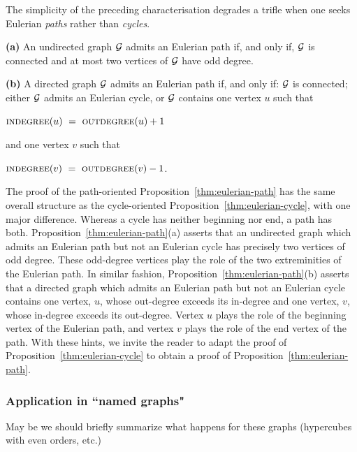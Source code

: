 The simplicity of the preceding characterisation degrades a trifle when
one seeks Eulerian {\em paths} rather than {\em cycles}.

\begin{prop}
\label{thm:eulerian-path}
{\bf (a)}
An undirected graph $\mbox{$\cal G$}$ admits an Eulerian path if, and only if,
$\mbox{$\cal G$}$ is connected and at most two vertices of $\mbox{$\cal G$}$ have odd degree.

{\bf (b)}
A directed graph $\mbox{$\cal G$}$ admits an Eulerian path if, and only if: $\mbox{$\cal G$}$ is
connected; either $\mbox{$\cal G$}$ admits an Eulerian cycle, or $\mbox{$\cal G$}$ contains one
vertex $u$ such that

\hspace*{.5in}$\mbox{\sc indegree}(u) \ = \ \mbox{\sc outdegree}(u) +1$

\noindent
and one vertex $v$ such that

\hspace*{.5in}$\mbox{\sc indegree}(v) \ = \ \mbox{\sc outdegree}(v) -1$.
\end{prop}

The proof of the path-oriented Proposition~\ref{thm:eulerian-path} has
the same overall structure as the cycle-oriented
Proposition~\ref{thm:eulerian-cycle}, with one major difference.
Whereas a cycle has neither beginning nor end, a path has both.
Proposition~\ref{thm:eulerian-path}(a) asserts that an undirected
graph which admits an Eulerian path but not an Eulerian cycle has
precisely two vertices of odd degree.  These odd-degree vertices play the
role of the two extreminities of the Eulerian path.  In similar fashion,
Proposition~\ref{thm:eulerian-path}(b) asserts that a directed graph
which admits an Eulerian path but not an Eulerian cycle contains one
vertex, $u$, whose out-degree exceeds its in-degree and one vertex, $v$,
whose in-degree exceeds its out-degree.  Vertex $u$ plays the role of
the beginning vertex of the Eulerian path, and vertex $v$ plays the role
of the end vertex of the path.  With these hints, we invite the reader
to adapt the proof of Proposition~\ref{thm:eulerian-cycle} to obtain a
proof of Proposition~\ref{thm:eulerian-path}.

\subsubsection{Application in ``named graphs" }

{\Denis May be we should briefly summarize what happens for these graphs 
(hypercubes with even orders, etc.)}
\medskip

